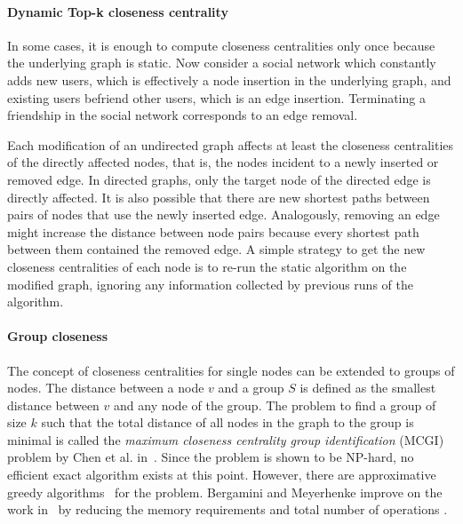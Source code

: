 
\paragraph{Dynamic Top-k closeness centrality}

In some cases, it is enough to compute closeness centralities only once because the underlying graph is static. Now consider a social network which constantly adds new users, which is effectively a node insertion in the underlying graph, and existing users befriend other users, which is an edge insertion. Terminating a friendship in the social network corresponds to an edge removal.

Each modification of an undirected graph affects at least the closeness centralities of the directly affected nodes, that is, the nodes incident to a newly inserted or removed edge. In directed graphs, only the target node of the directed edge is directly affected. It is also possible that there are new shortest paths between pairs of nodes that use the newly inserted edge. Analogously, removing an edge might increase the distance between node pairs because every shortest path between them contained the removed edge. A simple strategy to get the new closeness centralities of each node is to re-run the static algorithm on the modified graph, ignoring any information collected by previous runs of the algorithm.

\paragraph{Group closeness}
The concept of closeness centralities for single nodes can be extended to groups of nodes. The distance between a node $v$ and a group $S$ is defined as the smallest distance between $v$ and any node of the group. The problem to find a group of size $k$ such that the total distance of all nodes in the graph to the group is minimal is called the \emph{maximum closeness centrality group identification} (MCGI) problem by Chen et al. in~\cite{Chen2016}. Since the problem is shown to be NP-hard, no efficient exact algorithm exists at this point. However, there are approximative greedy algorithms~\cite{Chen2016,zhao2014measuring} for the problem. Bergamini and Meyerhenke improve on the work in~\cite{Chen2016} by reducing the memory requirements and total number of operations .



